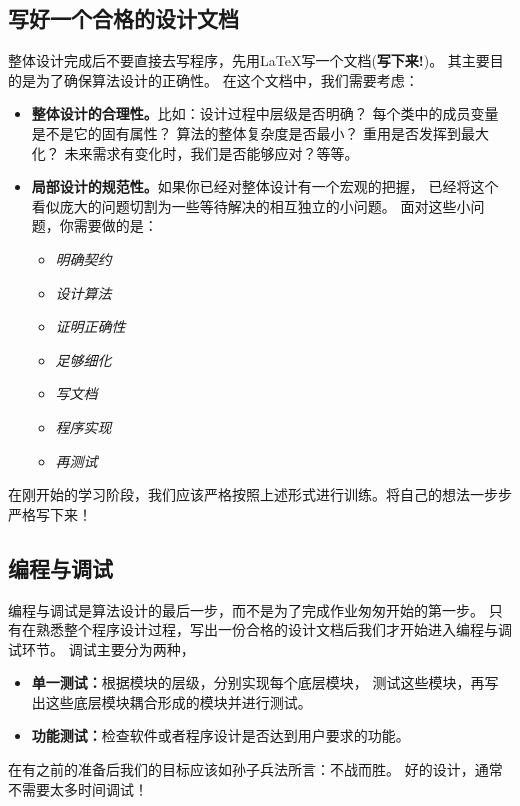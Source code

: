 \subsection{写好一个合格的设计文档}
整体设计完成后不要直接去写程序，先用\LaTeX{}写一个文档(\textbf{写下来!})。
其主要目的是为了确保算法设计的正确性。
在这个文档中，我们需要考虑：
\begin{itemize}
\item \textbf{整体设计的合理性。}比如：设计过程中层级是否明确？
  每个类中的成员变量是不是它的固有属性？
  算法的整体复杂度是否最小？
  重用是否发挥到最大化？
  未来需求有变化时，我们是否能够应对？等等。
\item \textbf{局部设计的规范性。}如果你已经对整体设计有一个宏观的把握， 
  已经将这个看似庞大的问题切割为一些等待解决的相互独立的小问题。
  面对这些小问题，你需要做的是：
  \begin{itemize}
  \item \emph{明确契约}
  \item \emph{设计算法}
  \item \emph{证明正确性}
  \item \emph{足够细化}
  \item \emph{写文档}
  \item \emph{程序实现}
  \item \emph{再测试}
  \end{itemize}
\end{itemize} 

\begin{remark}
在刚开始的学习阶段，我们应该严格按照上述形式进行训练。将自己的想法一步步严格写下来！
\end{remark}

\subsection{编程与调试}
编程与调试是算法设计的最后一步，而不是为了完成作业匆匆开始的第一步。
只有在熟悉整个程序设计过程，写出一份合格的设计文档后我们才开始进入编程与调试环节。
调试主要分为两种，
\begin{itemize}
\item \textbf{单一测试：}根据模块的层级，分别实现每个底层模块，
  测试这些模块，再写出这些底层模块耦合形成的模块并进行测试。 
\item \textbf{功能测试：}检查软件或者程序设计是否达到用户要求的功能。 
\end{itemize}
在有之前的准备后我们的目标应该如孙子兵法所言：不战而胜。 
好的设计，通常不需要太多时间调试！



